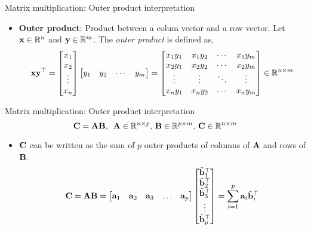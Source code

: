 \documentclass[aspectratio=169]{beamer}
\begin{document}
\begin{frame}[t]{Matrix multiplication: Outer product interpretation}
  \begin{itemize}
    \item \textbf{Outer product}: Product between a colum vector and a row vector. Let $\mathbf{x} \in \mathbb{R}^n$ and $\mathbf{y} \in \mathbb{R}^m$. The \textit{outer product} is defined as,
    \[ \mathbf{x}\mathbf{y}^{\top} = \begin{bmatrix}
      x_1\\ x_2\\ \vdots \\x_n
    \end{bmatrix} \begin{bmatrix}
      y_1 &  y_2 & \cdots & y_m
    \end{bmatrix} = \begin{bmatrix}
      x_1y_1 &  x_1y_2 & \cdots & x_1y_m \\
      x_2y_1 &  x_2y_2 & \cdots & x_2y_m \\
      \vdots &  \vdots & \ddots & \vdots \\
      x_ny_1 &  x_ny_2 & \cdots & x_ny_m \\
    \end{bmatrix} \in \mathbb{R}^{n \times m} \]
  \end{itemize}
\end{frame}


\begin{frame}[t]{Matrix multiplication: Outer product interpretation}
  \[ \mathbf{C} = \mathbf{A}\mathbf{B}, \,\,\, \mathbf{A} \in \mathbb{R}^{n \times p}, \, \mathbf{B} \in \mathbb{R}^{p \times m}, \, \mathbf{C} \in \mathbb{R}^{n \times m} \]
  \begin{itemize}
    \item $\mathbf{C}$ can be written as the sum of $p$ outer products of columns of $\mathbf{A}$ and rows of $\mathbf{B}$.
    \[ \mathbf{C} = \mathbf{A}\mathbf{B} = \begin{bmatrix}
      \mathbf{a}_1 & \mathbf{a}_2 & \mathbf{a}_3 & \ldots & \mathbf{a}_p
    \end{bmatrix} \begin{bmatrix}
      \tilde{\mathbf{b}}_1^{\top} \\
      \tilde{\mathbf{b}}_2^{\top} \\
      \tilde{\mathbf{b}}_3^{\top} \\
      \vdots \\
      \tilde{\mathbf{b}}_p^{\top}
    \end{bmatrix} = \sum_{i=1}^{p}\mathbf{a}_i\tilde{\mathbf{b}}_i^{\top} \]
  \end{itemize}
\end{frame}
\end{document}

